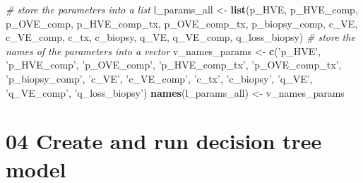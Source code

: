 \documentclass[]{article}
\newenvironment{Shaded}{\begin{snugshade}}{\end{snugshade}}
\newcommand{\KeywordTok}[1]{\textcolor[rgb]{0.13,0.29,0.53}{\textbf{#1}}}
\newcommand{\StringTok}[1]{\textcolor[rgb]{0.31,0.60,0.02}{#1}}
\newcommand{\CommentTok}[1]{\textcolor[rgb]{0.56,0.35,0.01}{\textit{#1}}}
\newcommand{\NormalTok}[1]{#1}
\begin{document}
\begin{Shaded}
\begin{Highlighting}[]
\CommentTok{# store the parameters into a list}
\NormalTok{l_params_all <-}\StringTok{ }\KeywordTok{list}\NormalTok{(p_HVE, p_HVE_comp, p_OVE_comp, p_HVE_comp_tx, }
\NormalTok{                     p_OVE_comp_tx, p_biopsy_comp, }
\NormalTok{                     c_VE, c_VE_comp, c_tx, c_biopsy, }
\NormalTok{                     q_VE, q_VE_comp, q_loss_biopsy)}
\CommentTok{# store the names of the parameters into a vector}
\NormalTok{v_names_params <-}\StringTok{ }\KeywordTok{c}\NormalTok{(}\StringTok{'p_HVE'}\NormalTok{, }\StringTok{'p_HVE_comp'}\NormalTok{, }\StringTok{'p_OVE_comp'}\NormalTok{, }\StringTok{'p_HVE_comp_tx'}\NormalTok{, }
                    \StringTok{'p_OVE_comp_tx'}\NormalTok{, }\StringTok{'p_biopsy_comp'}\NormalTok{, }
                    \StringTok{'c_VE'}\NormalTok{, }\StringTok{'c_VE_comp'}\NormalTok{,  }\StringTok{'c_tx'}\NormalTok{, }\StringTok{'c_biopsy'}\NormalTok{, }
                    \StringTok{'q_VE'}\NormalTok{, }\StringTok{'q_VE_comp'}\NormalTok{, }\StringTok{'q_loss_biopsy'}\NormalTok{)}
\KeywordTok{names}\NormalTok{(l_params_all) <-}\StringTok{ }\NormalTok{v_names_params}
\end{Highlighting}
\end{Shaded}

\section{04 Create and run decision tree
model}\label{create-and-run-decision-tree-model}
\end{document}
